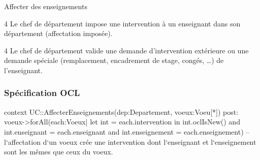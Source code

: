 \begin{usecase}{Affecter des enseignements}
 \begin{variation}
 \item [4] Le chef de département impose une intervention à un enseignant dans son département (affectation imposée).
 \item [4] Le chef de département valide une demande d'intervention extérieure ou une demande spéciale (remplacement, encadrement de stage, congés, \dots) de l'enseignant.
 \end{variation}
\end{usecase}

\subsubsection{Spécification OCL}
\begin{ocl}
context UC::AffecterEnseignements(dep:Departement, voeux:Voeu[*])
post:
voeux->forAll(each:Voeux| let int = each.intervention in
	int.oclIsNew() and int.enseignant = each.enseignant and
	int.enseignement = each.enseignement)
	-- l`affectation d`un voeux crée une intervention dont l`enseignant et l`enseignement sont les mêmes que ceux du voeux.
 \end{ocl}

